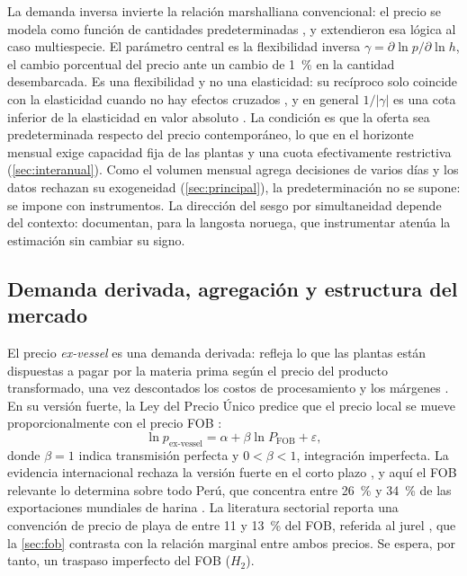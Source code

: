 \documentclass[11pt]{article}
\begin{document}
La demanda inversa invierte la relación marshalliana convencional: el precio se modela como función de cantidades predeterminadas \parencite{anderson1980}, y \textcite{eales1994} extendieron esa lógica al caso multiespecie. El parámetro central es la flexibilidad inversa $\gamma=\partial\ln p/\partial\ln h$, el cambio porcentual del precio ante un cambio de 1~\% en la cantidad desembarcada. Es una flexibilidad y no una elasticidad: su recíproco solo coincide con la elasticidad cuando no hay efectos cruzados \parencite{park1999}, y en general $1/|\gamma|$ es una cota inferior de la elasticidad en valor absoluto \parencite{houck1965}. La condición es que la oferta sea predeterminada respecto del precio contemporáneo, lo que en el horizonte mensual exige capacidad fija de las plantas y una cuota efectivamente restrictiva (\autoref{sec:interanual}). Como el volumen mensual agrega decisiones de varios días y los datos rechazan su exogeneidad (\autoref{sec:principal}), la predeterminación no se supone: se impone con instrumentos. La dirección del sesgo por simultaneidad depende del contexto: \textcite{hammarlund2022wind} documentan, para la langosta noruega, que instrumentar atenúa la estimación sin cambiar su signo.

\subsection{Demanda derivada, agregación y estructura del mercado}\label{sec:derivada}

El precio \textit{ex-vessel} es una demanda derivada: refleja lo que las plantas están dispuestas a pagar por la materia prima según el precio del producto transformado, una vez descontados los costos de procesamiento y los márgenes \parencite{asche2002}. En su versión fuerte, la Ley del Precio Único predice que el precio local se mueve proporcionalmente con el precio FOB \parencite{fackler2001}:
\begin{equation}\label{eq:lop}
  \ln p_{\text{ex-vessel}} = \alpha + \beta \ln P_{\text{FOB}} + \varepsilon,
\end{equation}
donde $\beta=1$ indica transmisión perfecta y $0<\beta<1$, integración imperfecta. La evidencia internacional rechaza la versión fuerte en el corto plazo \parencite{asche2007, nielsen2005whitefish, squires2023manta}, y aquí el FOB relevante lo determina sobre todo Perú, que concentra entre 26~\% y 34~\% de las exportaciones mundiales de harina \parencite{oecd_fao2023}. La literatura sectorial reporta una convención de precio de playa de entre 11 y 13~\% del FOB, referida al jurel \parencite{dresdner2014, kroetz2017}, que la \autoref{sec:fob} contrasta con la relación marginal entre ambos precios. Se espera, por tanto, un traspaso imperfecto del FOB ($H_2$).
\end{document}
